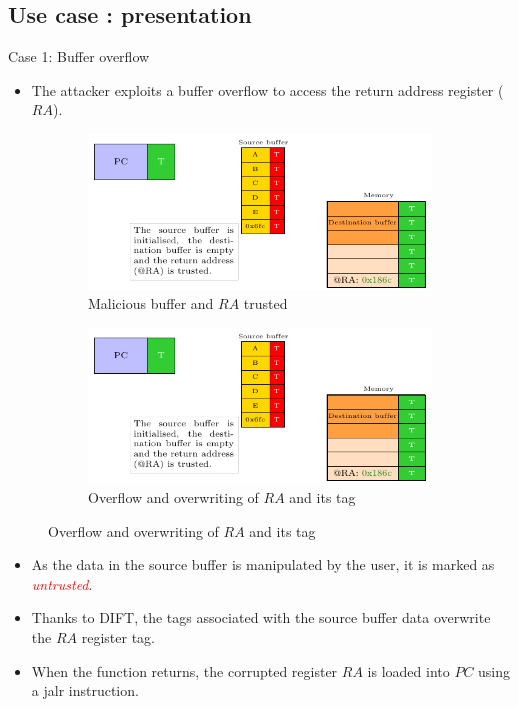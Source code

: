 \subsection{Use case : presentation}
\begin{frame}{Case 1: Buffer overflow}
    \begin{itemize}
        \item The attacker exploits a buffer overflow to access the return address register ($RA$).
    \end{itemize}

    \begin{figure}
        \centering
        \begin{subfigure}[l]{.45\textwidth}
            \centering
            \includegraphics[width=.9\textwidth, page=1]{src/2_vuln_assessment/img/buffer_overflow/schemaPedagogique.pdf}
            \caption{Malicious buffer and $RA$ trusted}
            \label{fig:bo_1st_step}
        \end{subfigure}
        \begin{subfigure}[r]{.45\textwidth}
            \centering
            \includegraphics[width=.9\textwidth, page=5]{src/2_vuln_assessment/img/buffer_overflow/schemaPedagogique.pdf}
            \caption{Overflow and overwriting of $RA$ and its tag}
            \label{fig:bo_3rd_step}
        \end{subfigure}
    \end{figure}

    \begin{itemize}
        \item As the data in the source buffer is manipulated by the user, it is marked as \textcolor{red}{\textit{untrusted}}.
        \item Thanks to DIFT, the tags associated with the source buffer data overwrite the $RA$ register tag.
        \item When the function returns, the corrupted register $RA$ is loaded into $PC$ using a jalr instruction.
    \end{itemize}
\end{frame}

